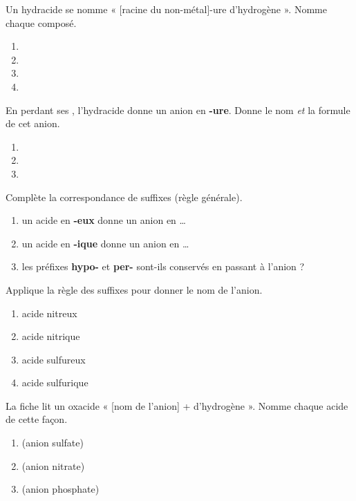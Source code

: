 \documentclass[11pt,a4paper]{article}
\begin{document}
\begin{exo}
Un hydracide se nomme « [racine du non-métal]-ure d'hydrogène ». Nomme chaque composé.
\begin{enumerate}[label=\alph*)]
  \item {}
  \item {}
  \item {}
  \item {}
\end{enumerate}
\end{exo}

\begin{exo}
En perdant ses , l'hydracide donne un anion en \textbf{-ure}. Donne le nom \emph{et} la formule de
cet anion.
\begin{enumerate}[label=\alph*)]
  \item {}
  \item {}
  \item {}
\end{enumerate}
\end{exo}

\begin{exo}
Complète la correspondance de suffixes (règle générale).
\begin{enumerate}[label=\alph*)]
  \item un acide en \textbf{-eux} donne un anion en \ldots
  \item un acide en \textbf{-ique} donne un anion en \ldots
  \item les préfixes \textbf{hypo-} et \textbf{per-} sont-ils conservés en passant à l'anion ?
\end{enumerate}
\end{exo}

\begin{exo}
Applique la règle des suffixes pour donner le nom de l'anion.
\begin{enumerate}[label=\alph*)]
  \item acide nitreux
  \item acide nitrique
  \item acide sulfureux
  \item acide sulfurique
\end{enumerate}
\end{exo}

\begin{exo}
La fiche lit un oxacide « [nom de l'anion] + d'hydrogène ». Nomme chaque acide de cette façon.
\begin{enumerate}[label=\alph*)]
  \item {} (anion sulfate)
  \item {} (anion nitrate)
  \item {} (anion phosphate)
\end{enumerate}
\end{exo}
\end{document}
